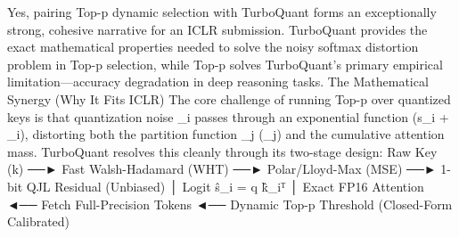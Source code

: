 Yes, pairing Top-p dynamic selection with TurboQuant forms an exceptionally strong, cohesive narrative for an ICLR submission.
TurboQuant provides the exact mathematical properties needed to solve the noisy softmax distortion problem in Top-p selection, while Top-p solves TurboQuant's primary empirical limitation—accuracy degradation in deep reasoning tasks.
The Mathematical Synergy (Why It Fits ICLR)
The core challenge of running Top-p over quantized keys is that quantization noise \delta_i passes through an exponential function \exp(s_i + \delta_i), distorting both the partition function \sum_j \exp(_j) and the cumulative attention mass. TurboQuant resolves this cleanly through its two-stage design:
Raw Key (k) ──► Fast Walsh-Hadamard (WHT) ──► Polar/Lloyd-Max (MSE) ──► 1-bit QJL Residual (Unbiased)
                                                                                  │
                                                                           Logit ŝ_i = q k̂_iᵀ
                                                                                  │
   Exact FP16 Attention ◄── Fetch Full-Precision Tokens ◄── Dynamic Top-p Threshold (Closed-Form Calibrated)

